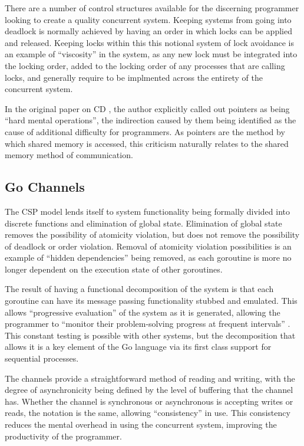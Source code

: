 \documentclass{sig-alternate}
\begin{document}
There are a number of control structures available for the discerning programmer looking to create a quality concurrent system. Keeping systems from going into deadlock is normally achieved by having an order in which locks can be applied and released. Keeping locks within this this notional system of lock avoidance is an example of ``viscosity'' in the system, as any new lock must be integrated into the locking order, added to the locking order of any processes that are calling locks, and generally require to be implmented across the entirety of the concurrent system.

In the original paper on CD \cite{enpl}, the author explicitly called out pointers as being ``hard mental operations'', the indirection caused by them being identified as the cause of additional difficulty for programmers. As pointers are the method by which shared memory is accessed, this criticism naturally relates to the shared memory method of communication. 

\subsection{Go Channels}
The CSP model lends itself to system functionality being formally divided into discrete functions and elimination of global state. Elimination of global state removes the possibility of atomicity violation, but does not remove the possibility of deadlock or order violation. Removal of atomicity violation possibilities is an example of ``hidden dependencies'' being removed, as each goroutine is more no longer dependent on the execution state of other goroutines.

The result of having a functional decomposition of the system is that each goroutine can have its message passing functionality stubbed and emulated. This allows ``progressive evaluation'' of the system as it is generated, allowing the programmer to ``monitor their problem-solving progress at frequent intervals'' \cite{enpl}. This constant testing is possible with other systems, but the decomposition that allows it is a key element of the Go language via its first class support for sequential processes.

The channels provide a straightforward method of reading and writing, with the degree of asynchronicity being defined by the level of buffering that the channel has. Whether the channel is synchronous or asynchronous is accepting writes or reads, the notation is the same, allowing ``consistency'' in use. This consistency reduces the mental overhead in using the concurrent system, improving the productivity of the programmer.
\end{document}
